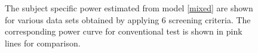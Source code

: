 \documentclass{article}
\begin{document}
\begin{figure}[hbtp]
   \centering
      \caption{The subject specific power estimated from model \ref{mixed} are shown for various data sets obtained by applying 6 screening criteria.  The corresponding power curve for conventional test is shown in pink lines for comparison.}
       \label{fig:power_screening_subject}	
\end{figure}
\end{document}
